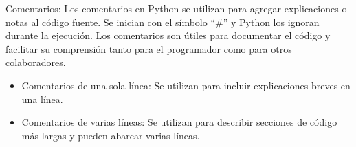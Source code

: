 Comentarios: Los comentarios en Python se utilizan para agregar explicaciones o notas al código fuente. Se inician con el símbolo ``\#'' y Python los ignoran durante la ejecución. Los comentarios son útiles para documentar el código y facilitar su comprensión tanto para el programador como para otros colaboradores. 
\begin{figure}[h]
    \centering
  \end{figure}
\begin{itemize}
    \item Comentarios de una sola línea: Se utilizan para incluir explicaciones breves en una línea.
    \item Comentarios de varias líneas: Se utilizan para describir secciones de código más largas y pueden abarcar varias líneas.
\end{itemize}

